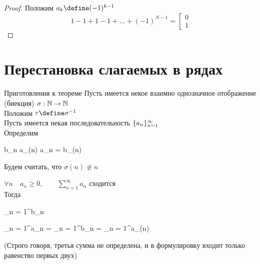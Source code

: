 \begin{proof}
	Положим $ a_k \define (-1)^{k - 1} $
	$$ 1 - 1 + 1 - 1 + ... + (-1)^{N - 1} = \left[
	\begin{aligned}
		0 \\
		1
	\end{aligned} \right. $$
\end{proof}

\section{Перестановка слагаемых в рядах}

\begin{undefthm}{Приготовления к теореме}
	Пусть имеется некое взаимно однозначное отображение (биекция) $ \sigma : \mathbb{N} \to \mathbb{N} $ \\
	Положим $ \tau \define \sigma^{-1} $ \\
	Пусть имеется некая последовательность $ \{a_n\}_{n=1}^{\infty} $ \\
	Определим
	\begin{equ}{51}
		b_n  a_{\sigma(n)} \iff a_n = b_{\tau(n)}
	\end{equ}
	Будем считать, что $ \sigma(n) \not\equiv n $
\end{undefthm}

\begin{theorem}
	$ \forall n \quad a_n \ge 0, \qquad \sum_{n = 1}^\infty a_n $ сходится \\
	Тогда
	\begin{equ}{52}
		\sum_{n = 1}^\infty b_n 
	\end{equ}
	\begin{equ}{53}
		\sum_{n = 1}^\infty a_n = \sum_{n = 1}^\infty b_n = \sum_{n = 1}^\infty a_{\sigma(n)}
	\end{equ}
	(Строго говоря, третья сумма не определена, и в формулировку входит только равенство первых двух)
\end{theorem}

